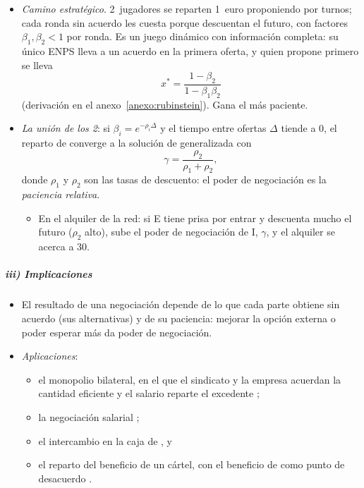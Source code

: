 \documentclass[11pt]{article}
\begin{document}
\begin{itemize}
\begin{itemize}
  \end{itemize}
\item \emph{Camino estratégico}\nocite{Rubinstein1982Perfect}. 2~jugadores se reparten 1~euro proponiendo por turnos; cada ronda sin acuerdo les cuesta porque descuentan el futuro, con factores $\beta_1,\beta_2<1$ por ronda. Es un juego dinámico con información completa: su único ENPS lleva a un acuerdo en la primera oferta, y quien propone primero se lleva
\[
x^*=\frac{1-\beta_2}{1-\beta_1\beta_2}
\]
  (derivación en el anexo~\ref{anexo:rubinstein}). Gana el más paciente.
\item \emph{La unión de los 2}\nocite{BinmoreRubinsteinWolinsky1986Nash}: si $\beta_i=e^{-\rho_i\Delta}$ y el tiempo entre ofertas $\Delta$ tiende a 0, el reparto de  converge a la solución de  generalizada con
\[
\gamma=\frac{\rho_2}{\rho_1+\rho_2},
\]
  donde $\rho_1$ y $\rho_2$ son las tasas de descuento: el poder de negociación es la \emph{paciencia relativa}.
  \begin{itemize}
  \item En el alquiler de la red: si E tiene prisa por entrar y descuenta mucho el futuro ($\rho_2$ alto), sube el poder de negociación de \textup{I}, $\gamma$, y el alquiler se acerca a 30.
  \end{itemize}
\end{itemize}

\subparagraph{iii) Implicaciones}

\begin{itemize}
\item El resultado de una negociación depende de lo que cada parte obtiene sin acuerdo (sus alternativas) y de su paciencia: mejorar la opción externa o poder esperar más da poder de negociación.
\item \emph{Aplicaciones}:
  \begin{itemize}
  \item el monopolio bilateral, en el que el sindicato y la empresa acuerdan la cantidad eficiente y el salario reparte el excedente ;
  \item la negociación salarial ;
  \item el intercambio en la caja de  , y
  \item el reparto del beneficio de un cártel, con el beneficio de  como punto de desacuerdo .
  \end{itemize}
\end{itemize}
\end{document}
